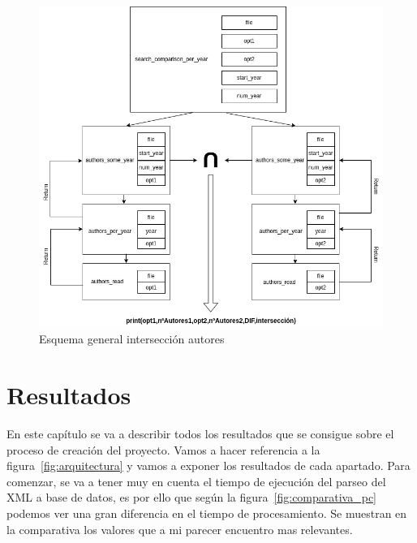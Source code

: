 \documentclass[a4paper, 12pt]{book}
\begin{document}
\begin{figure}[h]
  \centering
  \includegraphics[width=16cm, keepaspectratio]{img/s_c_p_y.png}
  \caption{Esquema general intersección autores}
  \label{fig:s_c_p_y}
\end{figure}

\cleardoublepage
\chapter{Resultados}
\label{chap:resultados}

En este capítulo se va a describir todos los resultados que se consigue sobre el proceso de creación del proyecto. Vamos a hacer referencia a la figura~\ref{fig:arquitectura} y vamos a exponer los resultados de cada apartado.
Para comenzar, se va a tener muy en cuenta el tiempo de ejecución del parseo del XML a base de datos, es por ello que según la figura~\ref{fig:comparativa_pc} podemos ver una gran diferencia en el tiempo de procesamiento. Se muestran en la comparativa los valores que a mi parecer encuentro mas relevantes.
\end{document}
